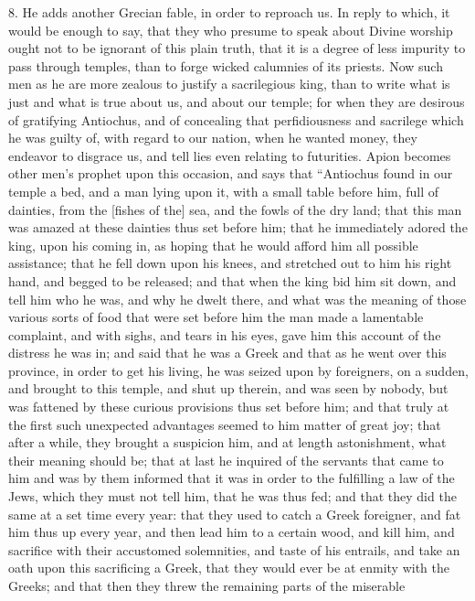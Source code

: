 8. He adds another Grecian fable, in order to reproach us. In reply to
which, it would be enough to say, that they who presume to speak about
Divine worship ought not to be ignorant of this plain truth, that it is a
degree of less impurity to pass through temples, than to forge wicked
calumnies of its priests. Now such men as he are more zealous to justify a
sacrilegious king, than to write what is just and what is true about us,
and about our temple; for when they are desirous of gratifying Antiochus,
and of concealing that perfidiousness and sacrilege which he was guilty
of, with regard to our nation, when he wanted money, they endeavor to
disgrace us, and tell lies even relating to futurities. Apion becomes
other men's prophet upon this occasion, and says that ``Antiochus found in
our temple a bed, and a man lying upon it, with a small table before him,
full of dainties, from the [fishes of the] sea, and the fowls of the dry
land; that this man was amazed at these dainties thus set before him; that
he immediately adored the king, upon his coming in, as hoping that he
would afford him all possible assistance; that he fell down upon his
knees, and stretched out to him his right hand, and begged to be released;
and that when the king bid him sit down, and tell him who he was, and why
he dwelt there, and what was the meaning of those various sorts of food
that were set before him the man made a lamentable complaint, and with
sighs, and tears in his eyes, gave him this account of the distress he was
in; and said that he was a Greek and that as he went over this province,
in order to get his living, he was seized upon by foreigners, on a sudden,
and brought to this temple, and shut up therein, and was seen by nobody,
but was fattened by these curious provisions thus set before him; and that
truly at the first such unexpected advantages seemed to him matter of
great joy; that after a while, they brought a suspicion him, and at length
astonishment, what their meaning should be; that at last he inquired of
the servants that came to him and was by them informed that it was in
order to the fulfilling a law of the Jews, which they must not tell him,
that he was thus fed; and that they did the same at a set time every year:
that they used to catch a Greek foreigner, and fat him thus up every year,
and then lead him to a certain wood, and kill him, and sacrifice with
their accustomed solemnities, and taste of his entrails, and take an oath
upon this sacrificing a Greek, that they would ever be at enmity with the
Greeks; and that then they threw the remaining parts of the miserable
